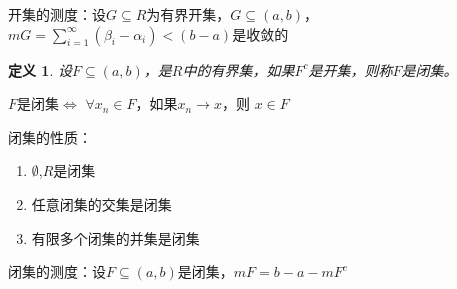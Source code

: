 \documentclass[UTF8]{ctexbook}
\newtheorem{definition}{定义}[chapter]
\begin{document}
开集的测度：设$G \subseteq R$为有界开集，$G \subseteq (a,b)$，$mG = \sum^{\infty}_{i=1}
(\beta_i- \alpha_i) < (b-a)$是收敛的

\begin{definition}
    设$F \subseteq (a,b)$，是$R$中的有界集，如果$F^c$是开集，则称$F$是闭集。
\end{definition}

$F$是闭集$\Leftrightarrow$ $\forall x_n \in F$，如果$x_n \rightarrow x$，则
$x \in F$

闭集的性质：
\begin{enumerate}
    \item $\emptyset$,$R$是闭集
    \item 任意闭集的交集是闭集
    \item 有限多个闭集的并集是闭集
\end{enumerate}

闭集的测度：设$F \subseteq (a,b)$是闭集，$mF = b-a - mF^c$
\end{document}
